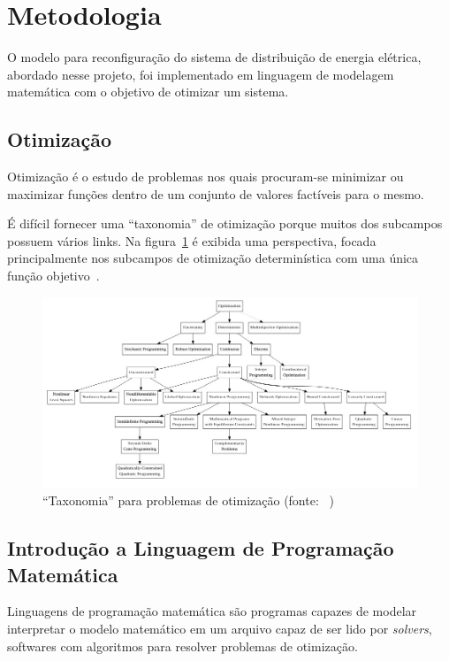 \section{Metodologia}

O modelo para reconfiguração do sistema de distribuição de energia elétrica, abordado nesse projeto, foi implementado em linguagem de modelagem matemática com o objetivo de otimizar um sistema.

\subsection{Otimização}

Otimização é o estudo de problemas nos quais procuram-se minimizar ou maximizar funções dentro de um conjunto de valores factíveis para o mesmo.

É difícil fornecer uma ``taxonomia'' de otimização porque muitos dos subcampos possuem vários links. Na figura~\ref{fig:taxonomia} é exibida uma perspectiva, focada principalmente nos subcampos de otimização determinística com uma única função objetivo~\cite{neosguidetaxonomia}.

\begin{figure}[H]
    \centering
    \includegraphics[width = \textwidth]{3_Methodology/otim.jpeg}
    \caption{``Taxonomia'' para problemas de otimização (fonte: ~\cite{neosguidetaxonomia})}
    \label{fig:taxonomia}
\end{figure}

\subsection{Introdução a Linguagem de Programação Matemática}

Linguagens de programação matemática são programas capazes de modelar interpretar o modelo matemático em um arquivo capaz de ser lido por \emph{solvers}, softwares com algoritmos para resolver problemas de otimização.

